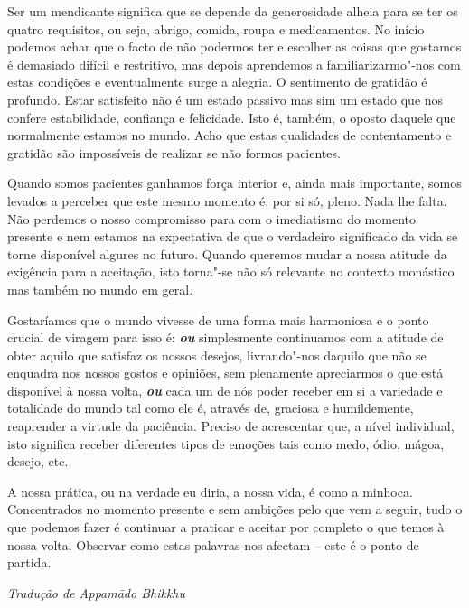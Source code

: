 Ser um mendicante significa que se depende da generosidade alheia para
se ter os quatro requisitos, ou seja, abrigo, comida, roupa e
medicamentos. No início podemos achar que o facto de não podermos ter e
escolher as coisas que gostamos é demasiado difícil e restritivo, mas
depois aprendemos a familiarizarmo"-nos com estas condições e
eventualmente surge a alegria. O sentimento de gratidão é profundo.
Estar satisfeito não é um estado passivo mas sim um estado que nos
confere estabilidade, confiança e felicidade. Isto é, também, o oposto
daquele que normalmente estamos no mundo. Acho que estas qualidades de
contentamento e gratidão são impossíveis de realizar se não formos
pacientes.

Quando somos pacientes ganhamos força interior e, ainda mais importante,
somos levados a perceber que este mesmo momento é, por si só, pleno.
Nada lhe falta. Não perdemos o nosso compromisso para com o imediatismo
do momento presente e nem estamos na expectativa de que o verdadeiro
significado da vida se torne disponível algures no futuro. Quando
queremos mudar a nossa atitude da exigência para a aceitação, isto
torna"-se não só relevante no contexto monástico mas também no mundo em
geral.

Gostaríamos que o mundo vivesse de uma forma mais harmoniosa e o ponto
crucial de viragem para isso é: \emph{\textbf{ou}} simplesmente
continuamos com a atitude de obter aquilo que satisfaz os nossos
desejos, livrando"-nos daquilo que não se enquadra nos nossos gostos e
opiniões, sem plenamente apreciarmos o que está disponível à nossa
volta, \emph{\textbf{ou}} cada um de nós poder receber em si a variedade
e totalidade do mundo tal como ele é, através de, graciosa e
humildemente, reaprender a virtude da paciência. Preciso de acrescentar
que, a nível individual, isto significa receber diferentes tipos de
emoções tais como medo, ódio, mágoa, desejo, etc.

A nossa prática, ou na verdade eu diria, a nossa vida, é como a minhoca.
Concentrados no momento presente e sem ambições pelo que vem a seguir,
tudo o que podemos fazer é continuar a praticar e aceitar por completo o
que temos à nossa volta. Observar como estas palavras nos afectam --
este é o ponto de partida.

\vfill
{\raggedleft\itshape\small
  Tradução de Appamādo Bhikkhu
\par}
